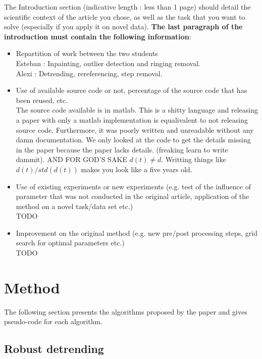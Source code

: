 \documentclass[11pt]{article}
\begin{document}
The Introduction section (indicative length : less than 1 page) should detail the scientific context of the article you chose, as well as the task that you want to solve (especially if you apply it on novel data). \textbf{The last paragraph of the introduction must contain the following information}:
\begin{itemize}
    \item Repartition of work between the two students\\
    
    Esteban : Inpainting, outlier detection and ringing removal.\\
    Alexi : Detrending, rereferencing, step removal.

    \item Use of available source code or not, percentage of the source code that has been reused, etc.\\
    
    The source code available is in matlab. This is a shitty language and releasing a paper with only a matlab implementation is equalivalent to not releasing source code. Furthermore, it was poorly written and unreadable without any damn documentation. We only looked at the code to get the details missing in the paper because the paper lacks details. (freaking learn to write dammit). AND FOR GOD'S SAKE \(d(t) \neq d\). Writting things like \(d(t)/std(d(t))\) makes you look like a five years old.

    \item Use of existing experiments or new experiments (e.g. test of the influence of parameter that was not conducted in the original article, application of the method on a novel task/data set etc.)\\
    
    TODO
    \item Improvement on the original method (e.g. new pre/post processing steps, grid search for optimal parameters etc.)\\
    
    TODO
\end{itemize}

\section{Method}

The following section presents the algorithms proposed by the paper and gives pseudo-code for each algorithm.

\subsection{Robust detrending}
\end{document}
